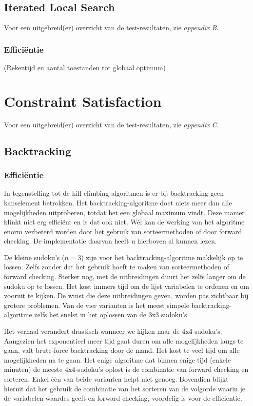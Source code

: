 \documentclass[]{report}
\begin{document}
\subsection{Iterated Local Search}
Voor een uitgebreid(er) overzicht van de test-resultaten, zie \textit{appendix B}.
\subsubsection{Effici\"{e}ntie}
(Rekentijd en aantal toestanden tot globaal optimum)
\section{Constraint Satisfaction}
Voor een uitgebreid(er) overzicht van de test-resultaten, zie \textit{appendix C}.
\subsection{Backtracking}
\subsubsection{Effici\"{e}ntie}
In tegenstelling tot de hill-climbing algoritmen is er bij backtracking geen kanselement betrokken. Het backtracking-algoritme doet niets meer dan alle mogelijkheden uitproberen, totdat het een globaal maximum vindt. Deze manier klinkt niet erg effici\"ent en is dat ook niet. W\'el kan de werking van het algoritme enorm verbeterd worden door het gebruik van sorteermethoden of door forward checking. De implementatie daarvan heeft u hierboven al kunnen lezen. 

De kleine sudoku's ($n = 3$) zijn voor het backtracking-algoritme makkelijk op te lossen. Zelfs zonder dat het gebruik hoeft te maken van sorteermethoden of forward checking. Sterker nog, met de uitbreidingen duurt het zelfs langer om de sudoku op te lossen. Het kost immers tijd om de lijst variabelen te ordenen en om vooruit te kijken. De winst die deze uitbreidingen geven, worden pas zichtbaar bij grotere problemen. Van de vier varianten is het meest simpele backtracking-algoritme zelfs het snelst in het oplossen van de 3x3 sudoku's.

Het verhaal verandert drastisch wanneer we kijken naar de 4x4 sudoku's. Aangezien het exponentieel meer tijd gaat duren om alle mogelijkheden langs te gaan, valt brute-force backtracking door de mand. Het kost te veel tijd om alle mogelijkheden na te gaan. Het enige algoritme dat binnen enige tijd (enkele minuten) de meeste 4x4-sudoku's oplost is de combinatie van forward checking en sorteren. Enkel \'e\'en van beide varianten helpt niet genoeg. Bovendien blijkt hieruit dat het gebruik de combinatie van het sorteren van de volgorde waarin je de variabelen waardes geeft en forward checking, voordelig is voor de efficientie. 
\end{document}
